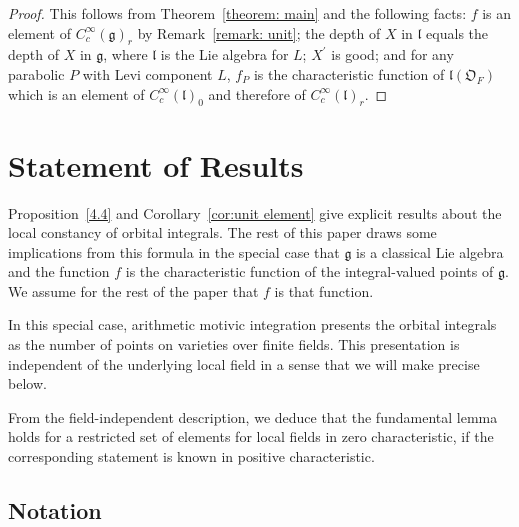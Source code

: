 \documentclass[11pt]{amsart}
\theoremstyle{definition}
\theoremstyle{remark}
\numberwithin{equation}{theorem}
\def\F{{F}}
\def\A{{\mathfrak{O}_\F}}
\def\LF{{L}}
\def\PF{{P}}
\def\lF{{\mathfrak{l}}}
\def\gF{{\mathfrak{g}}}
\def\Sch#1{{C^\infty_c(#1)}}
\def\lie#1{{\mathfrak{#1}}}
\begin{document}
\begin{proof}
This follows from Theorem~\ref{theorem: main} and the following
facts: $f$ is an element of $\Sch{\gF}_r$ by Remark~\ref{remark:
unit}; the depth of $X$ in $\lF$ equals the depth of $X$ in $\gF$,
where $\lF$ is the Lie algebra for $\LF$; $X^\prime$ is good; and
for any parabolic $\PF$ with Levi component $\LF$, $f_\PF$ is the
characteristic function of $\lF(\A)$ which is an element of
$\Sch{\lF}_0$ and therefore of $\Sch{\lF}_r$.
\end{proof}


\section{Statement of Results}\label{sec:statement}

Proposition~\ref{4.4} and Corollary~\ref{cor:unit element} give
explicit results about the local constancy of orbital integrals.
The rest of this paper draws some implications from this formula
in the special case that $\lie{g}$ is a classical Lie algebra and
the function $f$ is the characteristic function of the
integral-valued points of $\lie{g}$.  We assume for the rest of
the paper that $f$ is that function.

In this special case, arithmetic motivic integration presents the
orbital integrals as the number of points on varieties over finite
fields. This presentation is independent of the underlying local
field in a sense that we will make precise below.

From the field-independent description, we deduce that the
fundamental lemma holds for a restricted set of elements for local
fields in zero characteristic, if the corresponding statement is
known in positive characteristic.

\subsection{Notation}
\end{document}
